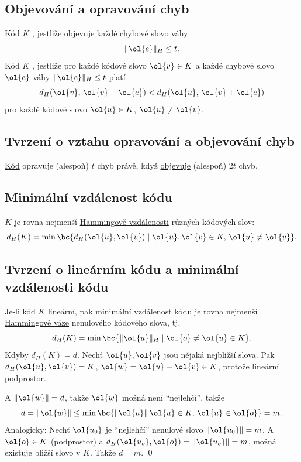 \subsection{Objevování a opravování chyb}
\hyperref[kod]{Kód} $K$ , jestliže objevuje každé chybové slovo váhy 
\begin{equation}
	\|\ol{e}\|_H \leq t.
\end{equation}
Kód $K$ , jestliže pro každé kódové slovo $\ol{v} \in K$ a každé chybové slovo $\ol{e}$ váhy $\|\ol{e}\|_H \leq t$ platí
\begin{equation}
	d_H(\ol{v}, \, \ol{v} + \ol{e}) < d_H(\ol{u}, \, \ol{v} + \ol{e})
\end{equation}
pro každé kódové slovo $\ol{u} \in K$, $\ol{u} \not= \ol{v}$.

\subsection{Tvrzení o vztahu opravování a objevování chyb}
\hyperref[kod]{Kód} opravuje (alespoň) $t$ chyb právě, když \hyperref[objevuje]{objevuje} (alespoň) $2t$ chyb.

\subsection{Minimální vzdálenost kódu}
 $K$ je rovna nejmenší \hyperref[hamVz]{Hammingově vzdálenosti} různých kódových slov:
\begin{equation}
	d_H(K) = \min\bc{d_H(\ol{u}, \ol{v}) \mid \ol{u}, \ol{v} \in K, \, \ol{u} \not= \ol{v}}.
\end{equation}

\subsection{Tvrzení o lineárním kódu a minimální vzdálenosti kódu}
Je-li kód $K$ lineární, pak minimální vzdálenost kódu je rovna nejmenší \hyperref[hamVa]{Hammingově váze} nenulového kódového slova, tj.
\begin{equation}
	d_H(K) = \min\bc{\|\ol{u}\|_H \mid \ol{o} \not= \ol{u} \in K}.
\end{equation}
\dukaz Kdyby $d_H(K) = d$. Nechť $\ol{u}, \ol{v}$ jsou nějaká nejbližší slova. Pak $d_H(\ol{u}, \ol{v}) = K$, $\ol{w} = \ol{u} - \ol{v} \in K$, protože lineární podprostor.

A $\|\ol{w}\| = d$, takže $\ol{w}$ možná není \enquote{nejlehčí}, takže
\begin{equation}
	d = \|\ol{w}\| \leq \min \bc{\|\ol{u}\|\, \ol{u} \in K, \, \ol{u} \in \ol{o}} = m.
\end{equation}
Analogicky: Nechť $\ol{u_0}$ je \enquote{nejlehčí} nenulové slovo $\|\ol{u_0}\| = m$. A $\ol{o} \in K$ (podprostor) a $d_H(\ol{u_o},\ol{o}) = \|\ol{u_o}\| = m$, možná existuje bližší slovo v $K$. Takže $d = m$.
\hspace{\fill}\qed

